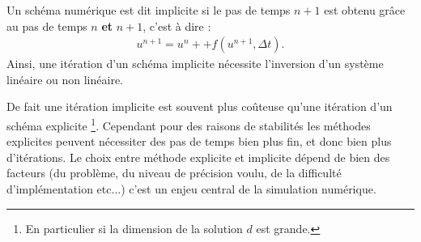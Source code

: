\begin{definition}
    Un schéma numérique est dit implicite si le pas de temps $n+1$ est obtenu grâce au pas de temps $n$ \textbf{et} $n+1$, c'est à dire : 
    \begin{align}
        u^{n+1} = u^n + + f(u^{n+1} ,\Delta t ).
    \end{align}
    Ainsi, une itération d'un schéma implicite nécessite l'inversion d'un système linéaire ou non linéaire. 
\end{definition}
De fait une itération implicite est souvent plus coûteuse qu'une itération d'un schéma explicite
\footnote{En particulier si la dimension de la solution $d$ est grande.}. 
Cependant pour des raisons de stabilités les méthodes explicites peuvent nécessiter des pas de temps bien plus fin, et donc bien plus d'itérations.
Le choix entre méthode explicite et implicite dépend de bien des facteurs (du problème, du niveau de précision voulu, de la difficulté d'implémentation etc...)
c'est un enjeu central de la simulation numérique.
